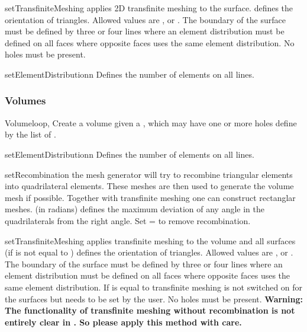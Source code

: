 \begin{methoddesc}[RuledSurface]{setTransfiniteMeshing}{}
applies 2D transfinite meshing to the surface. 
 defines the orientation of triangles. Allowed values
are ,  or . The 
boundary of the surface must be defined by three or four lines where an
element distribution must be defined on all faces where opposite 
faces uses the same element distribution. No holes must be present.
\end{methoddesc}

\begin{methoddesc}[RuledSurface]{setElementDistribution}{n}
Defines the number of elements on all lines.
\end{methoddesc}

\subsubsection{Volumes}

\begin{classdesc}{Volume}{loop, }
Create a volume given a , which may have one or more holes
define by the list of .
\end{classdesc}

\begin{methoddesc}[Volume]{setElementDistribution}{n}
Defines the number of elements on all lines.
\end{methoddesc}

\begin{methoddesc}[Volume]{setRecombination}{}
the mesh generator will try to recombine triangular elements 
into quadrilateral elements. These meshes are then used to generate the volume mesh if possible. 
Together with transfinite meshing one can construct rectanglar meshes.
 (in radians) defines the maximum deviation of any angle in the quadrilaterals from the right angle.  
Set = to remove recombination.
\end{methoddesc}

\begin{methoddesc}[Volume]{setTransfiniteMeshing}{}
applies transfinite meshing to the volume and all surfaces (if  is not equal to ) 
 defines the orientation of triangles. Allowed values
are ,  or . The 
boundary of the surface must be defined by three or four lines where an
element distribution must be defined on all faces where opposite 
faces uses the same element distribution. 
If  is equal to  transfinite meshing is not switched on for the surfaces but needs
to be set by the user. No holes must be present.
\textbf{Warning: The functionality of transfinite meshing without recombination is not entirely clear in \gmshextern. 
So please apply this method with care.}
\end{methoddesc}


